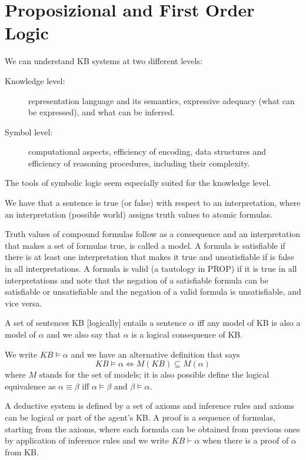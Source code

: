 \section{Proposizional and First Order Logic}
We can understand KB systems at two different levels:
\begin{description}
    \item [Knowledge level: ] representation language and its semantics, 
	   expressive adequacy (what can be expressed), and what can be inferred.
    \item [Symbol level: ] computational aspects, efficiency of encoding, data structures
	    and efficiency of reasoning procedures, including their complexity.
\end{description}
The tools of symbolic logic seem especially suited for the knowledge level.

We have that a sentence is true (or false) with respect to an interpretation, where
an interpretation (possible world) assigns truth values to atomic formulas.

Truth values of compound formulas follow as a consequence and an interpretation that makes
a set of formulas true, is called a model.\newline
A formula is satisfiable if there is at least one interpretation that makes it true and 
unsatisfiable if is false in all interpretations.\newline
A formula is valid (a tautology in PROP) if it is true in all interpretations and note that
the negation of a satisfiable formula can be satisfiable or unsatisfiable and 
the negation of a valid formula is unsatisfiable, and vice versa.

A set of sentences KB [logically] entails a sentence $\alpha$ iff any model of KB is
also a model of $\alpha$ and we also say that $\alpha$ is a logical consequence of KB.

We write $KB \models \alpha$ and we have an alternative definition that says
\[ KB \models \alpha \iff M(KB) \subseteq M(\alpha) \]
where $M$ stands for the set of models; it is also possible define the logical equivalence
as $\alpha \equiv \beta$ iff $\alpha \models \beta$ and $\beta \models \alpha$.

A deductive system is defined by a set of axioms and inference rules and axioms can be
logical or part of the agent’s KB.\newline
A proof is a sequence of formulas, starting from the axioms, where each formula can
be obtained from previous ones by application of inference rules and 
we write $KB \vdash \alpha$ when there is a proof of $\alpha$ from KB.

